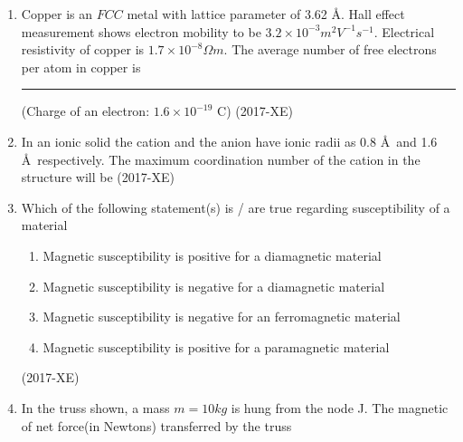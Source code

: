\documentclass[journal]{IEEEtran}
\begin{document}
\begin{enumerate}
    \item Copper is an $FCC$ metal with lattice parameter of 3.62 \AA . Hall effect measurement shows electron mobility to be $3.2 \times 10^{-3} {m}^2 {V}^{-1}{s}^{-1}$. Electrical resistivity of copper is $1.7 \times 10^{-8}  \Omega {m}$. The average number of free electrons per atom in copper is \rule{2.5cm}{0.5pt}(Charge of an electron: $1.6 \times 10^{-19}$ C) \hfill(2017-XE)
    \item In an ionic solid the cation and the anion have ionic radii as 0.8 \AA \ and 1.6 \AA \ respectively. The maximum coordination number of the cation in the structure will be \hfill(2017-XE)
 \begin{enumerate}
 \end{enumerate}
\item Which of the following statement(s) is / are true regarding susceptibility of a material
\begin{enumerate}[label=\roman*.]
    \item  Magnetic susceptibility is positive for a diamagnetic material 
    \item  Magnetic susceptibility is negative for a diamagnetic material 
    \item  Magnetic susceptibility is negative for an ferromagnetic material 
    \item Magnetic susceptibility is positive for a paramagnetic material
\end{enumerate}
\hfill(2017-XE)
\begin{enumerate}
\end{enumerate}
\item In the truss shown, a mass $m = 10kg$ is hung from the node J. The magnetic of net force(in Newtons) transferred by the truss 

\end{enumerate}
\end{document}
